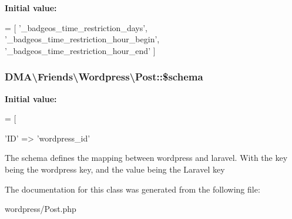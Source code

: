 {\bfseries Initial value\-:}
\begin{DoxyCode}
= [
        \textcolor{stringliteral}{'\_badgeos\_time\_restriction\_days'},
        \textcolor{stringliteral}{'\_badgeos\_time\_restriction\_hour\_begin'},
        \textcolor{stringliteral}{'\_badgeos\_time\_restriction\_hour\_end'}
    ]
\end{DoxyCode}
\hypertarget{classDMA_1_1Friends_1_1Wordpress_1_1Post_a38fc35f2a6a04046e386cfd3f3564d89}{
\subsubsection[{\$schema}]{\setlength{\rightskip}{0pt plus 5cm}D\-M\-A\textbackslash{}\-Friends\textbackslash{}\-Wordpress\textbackslash{}\-Post\-::\$schema}}\label{classDMA_1_1Friends_1_1Wordpress_1_1Post_a38fc35f2a6a04046e386cfd3f3564d89}
{\bfseries Initial value\-:}
\begin{DoxyCode}
= [
        
        \textcolor{stringliteral}{'ID'}                                            => \textcolor{stringliteral}{'wordpress\_id'}
\end{DoxyCode}
The schema defines the mapping between wordpress and laravel. With the key being the wordpress key, and the value being the Laravel key 

The documentation for this class was generated from the following file\-:\begin{DoxyCompactItemize}
\item 
wordpress/Post.\-php\end{DoxyCompactItemize}
